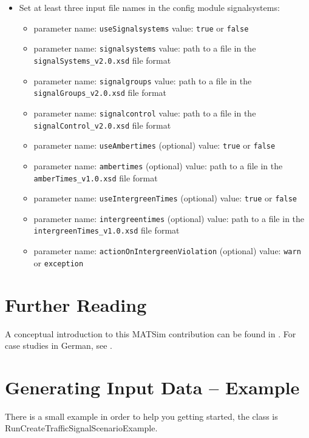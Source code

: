 \begin{itemize}
	\item Set at least three input file names in the config module signalsystems:
		\begin{itemize}
			\item parameter name: \lstinline$useSignalsystems$ value: \lstinline$true$ or \lstinline$false$
			\item parameter name: \lstinline$signalsystems$ value: path to a file in the \lstinline$signalSystems_v2.0.xsd$ file format
  		\item parameter name: \lstinline$signalgroups$ value: path to a file in the \lstinline$signalGroups_v2.0.xsd$ file format
 			\item parameter name: \lstinline$signalcontrol$ value: path to a file in the \lstinline$signalControl_v2.0.xsd$ file format
 			\item parameter name: \lstinline$useAmbertimes$ (optional) value: \lstinline$true$ or \lstinline$false$
 			\item parameter name: \lstinline$ambertimes$ (optional) value: path to a file in the \lstinline$amberTimes_v1.0.xsd$ file format
			\item parameter name: \lstinline$useIntergreenTimes$ (optional) value: \lstinline$true$ or \lstinline$false$
			\item parameter name: \lstinline$intergreentimes$ (optional) value: path to a file in the \lstinline$intergreenTimes_v1.0.xsd$ file format
			\item parameter name: \lstinline$actionOnIntergreenViolation$ (optional) value: \lstinline$warn$ or \lstinline$exception$
		\end{itemize}
\end{itemize}




\section{Further Reading}

A conceptual introduction to this MATSim contribution can be found in \cite{Grether2014PhD}. 
For case studies in German, see \cite{Bischoff2010BaSylvia,Neumann2008DA,Roeder2010BachelorGershenson}.

\section{Generating Input Data -- Example}

There is a small example in order to help you getting started, the class is RunCreateTrafficSignalScenarioExample.

